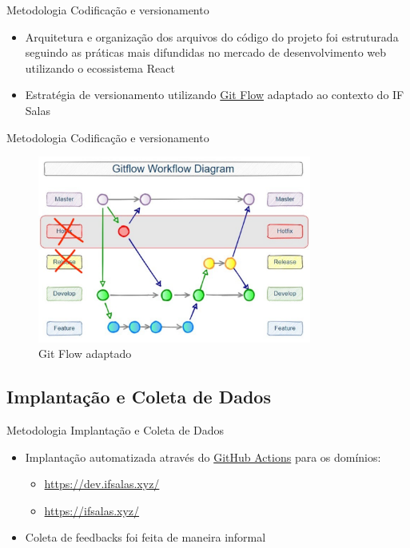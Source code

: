 \begin{frame}{Metodologia}
	{Codificação e versionamento}
	\begin{itemize}[<+->]
		\item Arquitetura e organização dos arquivos do código do projeto foi estruturada seguindo as práticas mais difundidas no mercado de desenvolvimento web utilizando o ecossistema React
		\item Estratégia de versionamento utilizando \href{https://nvie.com/posts/a-successful-git-branching-model/}{Git Flow} adaptado ao contexto do IF Salas
	\end{itemize}
\end{frame}

\begin{frame}{Metodologia}
	{Codificação e versionamento}
	\begin{figure}
		\includegraphics[width=9cm]{images/git-flow.png}
		\caption{Git Flow adaptado}
	\end{figure}
\end{frame}


\subsection{Implantação e Coleta de Dados}
\begin{frame}{Metodologia}
	{Implantação e Coleta de Dados}
	\begin{itemize}[<+->]
		\item Implantação automatizada através do \href{https://docs.github.com/en/actions}{GitHub Actions} para os domínios:
			\begin{itemize}
				\item \href{https://dev.ifsalas.xyz/}{https://dev.ifsalas.xyz/}
				\item \href{https://ifsalas.xyz/}{https://ifsalas.xyz/}
			\end{itemize}
		\item Coleta de feedbacks foi feita de maneira informal
	\end{itemize}
\end{frame}